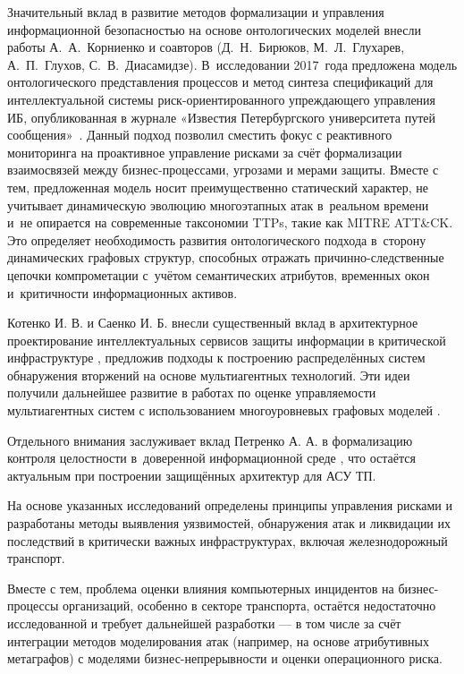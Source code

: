 Значительный вклад в развитие методов формализации и управления информационной безопасностью на основе онтологических моделей внесли работы А.~А.~Корниенко и соавторов (Д.~Н.~Бирюков, М.~Л.~Глухарев, А.~П.~Глухов, С.~В.~Диасамидзе). В~исследовании 2017~года предложена модель онтологического представления процессов и метод синтеза спецификаций для интеллектуальной системы риск-ориентированного упреждающего управления ИБ, опубликованная в журнале «Известия Петербургского университета путей сообщения»~\autocite{Kornienko2017}. Данный подход позволил сместить фокус с реактивного мониторинга на проактивное управление рисками за счёт формализации взаимосвязей между бизнес-процессами, угрозами и мерами защиты. Вместе с тем, предложенная модель носит преимущественно статический характер, не учитывает динамическую эволюцию многоэтапных атак в~реальном времени и~не опирается на современные таксономии TTPs, такие как MITRE ATT\&CK. Это определяет необходимость развития онтологического подхода в~сторону динамических графовых структур, способных отражать причинно-следственные цепочки компрометации с~учётом семантических атрибутов, временных окон и~критичности информационных активов.

 Котенко И. В. и Саенко И. Б. внесли существенный вклад в архитектурное проектирование интеллектуальных сервисов защиты информации в критической инфраструктуре \autocite{Kotenko2013}, предложив подходы к построению распределённых систем обнаружения вторжений на основе мультиагентных технологий. Эти идеи получили дальнейшее развитие в работах по оценке управляемости мультиагентных систем с использованием многоуровневых графовых моделей \autocite{Zegzhda2016}.

Отдельного внимания заслуживает вклад Петренко А. А. в формализацию контроля целостности в~доверенной информационной среде \autocite{Zegzhda2020}, что остаётся актуальным при построении защищённых архитектур для АСУ ТП.

На основе указанных исследований определены принципы управления рисками и разработаны методы выявления уязвимостей, обнаружения атак и ликвидации их последствий в критически важных инфраструктурах, включая железнодорожный транспорт.

Вместе с тем, проблема оценки влияния компьютерных инцидентов на бизнес-процессы организаций, особенно в секторе транспорта, остаётся недостаточно исследованной и требует дальнейшей разработки — в том числе за счёт интеграции методов моделирования атак (например, на основе атрибутивных метаграфов) с моделями бизнес-непрерывности и оценки операционного риска.

